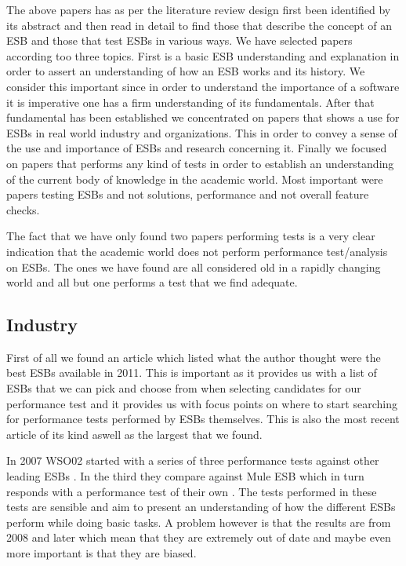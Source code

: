 \documentclass{llncs}
\begin{document}
The above papers has as per the literature review design first been identified by its abstract and then read in detail to find those that describe the concept of an ESB and those that test ESBs in various ways. We have selected papers according too three topics. First is a basic ESB understanding and explanation in order to assert an understanding of how an ESB works and its history. We consider this important since in order to understand the importance of a software it is imperative one has a firm understanding of its fundamentals. After that fundamental has been established we concentrated on papers that shows a use for ESBs in real world industry and organizations. This in order to convey a sense of the use and importance of ESBs and research concerning it.
Finally we focused on papers that performs any kind of tests in order to establish an understanding of the current body of knowledge in the academic world. Most important were papers testing ESBs and not solutions, performance and not overall feature checks.


The fact that we have only found two papers performing tests is a very clear indication that the academic world does not perform performance test/analysis on ESBs. The ones we have found are all considered old in a rapidly changing world and all but one performs a test that we find adequate.


\subsection{Industry}

First of all we found an article\cite{mehta11} which listed what the author thought were the best ESBs available in 2011. This is important as it provides us with a list of ESBs that we can pick and choose from when selecting candidates for our performance test and it provides us with focus points on where to start searching for performance tests performed by ESBs themselves. This is also the most recent article of its kind aswell as the largest that we found.

In 2007 WSO02 started with a series of three performance tests against other leading ESBs \cite{Perera07,Perera07R2,Perera07R3}. In the third they compare against Mule ESB which in turn responds with a performance test of their own \cite{mulesoft08}. The tests performed in these tests are sensible and aim to present an understanding of how the different ESBs perform while doing basic tasks. A problem however is that the results are from 2008 and later which mean that they are extremely out of date and maybe even more important is that they are biased.
\end{document}
